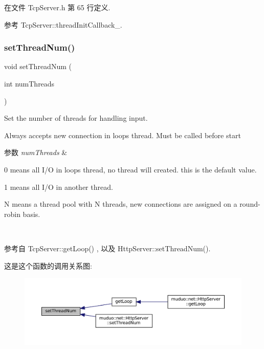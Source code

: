 在文件 Tcp\+Server.\+h 第 65 行定义.



参考 Tcp\+Server\+::thread\+Init\+Callback\+\_\+.

\mbox{\label{classmuduo_1_1net_1_1TcpServer_a83bb28d139df96ba9fc449b4643f2c36}} 
\subsubsection{\texorpdfstring{set\+Thread\+Num()}{setThreadNum()}}
{\footnotesize\ttfamily void set\+Thread\+Num (\begin{DoxyParamCaption}\item[{int}]{num\+Threads }\end{DoxyParamCaption})}

Set the number of threads for handling input.

Always accepts new connection in loop\textquotesingle{}s thread. Must be called before {\ttfamily start} 
\begin{DoxyParams}{参数}
{\em num\+Threads} & 
\begin{DoxyItemize}
\item 0 means all I/O in loop\textquotesingle{}s thread, no thread will created. this is the default value.
\item 1 means all I/O in another thread.
\item N means a thread pool with N threads, new connections are assigned on a round-\/robin basis. 
\end{DoxyItemize}\\
\hline
\end{DoxyParams}


参考自 Tcp\+Server\+::get\+Loop() , 以及 Http\+Server\+::set\+Thread\+Num().

这是这个函数的调用关系图\+:
\nopagebreak
\begin{figure}[H]
\begin{center}
\leavevmode
\includegraphics[width=350pt]{classmuduo_1_1net_1_1TcpServer_a83bb28d139df96ba9fc449b4643f2c36_icgraph}
\end{center}
\end{figure}
\mbox{\label{classmuduo_1_1net_1_1TcpServer_a94b31be320453fc8aeae81b25934b43f}} 
